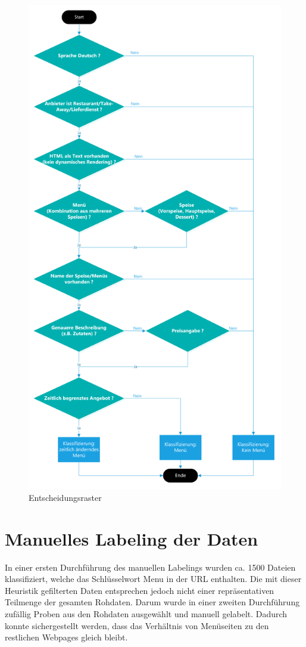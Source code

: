 \begin{figure}
	\centering
	\includegraphics[width=0.75\columnwidth,keepaspectratio]{img/man-classification-tree.png}
	\caption{Entscheidungsraster}
	\label{fig:classificationtree}
\end{figure}
\section{Manuelles Labeling der Daten}
In einer ersten Durchführung des manuellen Labelings wurden ca. 1500 Dateien klassifiziert, welche das Schlüsselwort \glqq Menu\grqq{} in der URL enthalten.
Die mit dieser Heuristik gefilterten Daten entsprechen jedoch nicht einer repräsentativen Teilmenge der gesamten Rohdaten.
Darum wurde in einer zweiten Durchführung zufällig Proben aus den Rohdaten ausgewählt und manuell gelabelt.
Dadurch konnte sichergestellt werden, dass das Verhältnis von Menüseiten zu den restlichen Webpages gleich bleibt.

